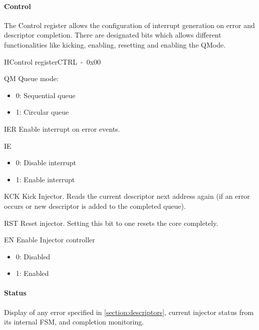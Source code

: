 \paragraph{Control} %
The Control register allows the configuration of interrupt generation on error and descriptor completion. There are designated bits which allows different functionalities like kicking, enabling, resetting and enabling the QMode.\\
\begin{register}{H}{Control register}{CTRL~-~0x00}
    \label{reg_control}%
    \regnewline%
    \begin{regdesc}\begin{reglist}
        \item [QM]Queue mode:
		\begin{itemize}
  		\item 0: Sequential queue
  		\item 1: Circular queue
		\end{itemize}
        \item [IER]Enable interrupt on error events.
        \item [IE]\begin{itemize}
  		\item 0: Disable interrupt
  		\item 1: Enable interrupt
		\end{itemize}
        \item [KCK]Kick Injector. Reads the current descriptor next address again 
	(if an error occurs or new descriptor is added to the completed queue).
        \item [RST]Reset injector. Setting this bit to one resets the core completely.
        \item [EN]Enable Injector controller
		\begin{itemize}
  		\item 0: Disabled
  		\item 1: Enabled
		\end{itemize}
\end{reglist}\end{regdesc}\end{register}


\newpage
\paragraph{Status}
Display of any error specified in \ref{section:descriptors}, current injector status from its internal FSM, and completion monitoring.\\
\vspace{0.3cm}

